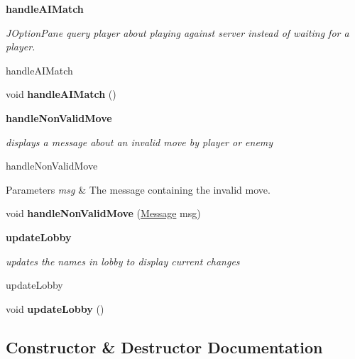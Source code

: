 \begin{Indent}{\bf handle\+A\+I\+Match}\par
{\em J\+Option\+Pane query player about playing against server instead of waiting for a player.

handle\+A\+I\+Match }\begin{DoxyCompactItemize}
\item 
\hypertarget{classbattleship_1_1game_1_1Player_a497f3d3a9cbd930561726fdca93eb621}{}void {\bfseries handle\+A\+I\+Match} ()\label{classbattleship_1_1game_1_1Player_a497f3d3a9cbd930561726fdca93eb621}

\end{DoxyCompactItemize}
\end{Indent}
\begin{Indent}{\bf handle\+Non\+Valid\+Move}\par
{\em displays a message about an invalid move by player or enemy

handle\+Non\+Valid\+Move


\begin{DoxyParams}{Parameters}
{\em msg} & The message containing the invalid move. \\
\hline
\end{DoxyParams}
}\begin{DoxyCompactItemize}
\item 
\hypertarget{classbattleship_1_1game_1_1Player_a20ff4072d02c459eeb6cbf45df6a4a27}{}void {\bfseries handle\+Non\+Valid\+Move} (\hyperlink{classbattleship_1_1game_1_1Message}{Message} msg)\label{classbattleship_1_1game_1_1Player_a20ff4072d02c459eeb6cbf45df6a4a27}

\end{DoxyCompactItemize}
\end{Indent}
\begin{Indent}{\bf update\+Lobby}\par
{\em updates the names in lobby to display current changes

update\+Lobby }\begin{DoxyCompactItemize}
\item 
\hypertarget{classbattleship_1_1game_1_1Player_a27136c32636e901372e4ee7834158a06}{}void {\bfseries update\+Lobby} ()\label{classbattleship_1_1game_1_1Player_a27136c32636e901372e4ee7834158a06}

\end{DoxyCompactItemize}
\end{Indent}


\subsection{Constructor \& Destructor Documentation}
\hypertarget{classbattleship_1_1game_1_1Player_a4461129b3ce0b1bf218b91d05c5c3aa0}{}
